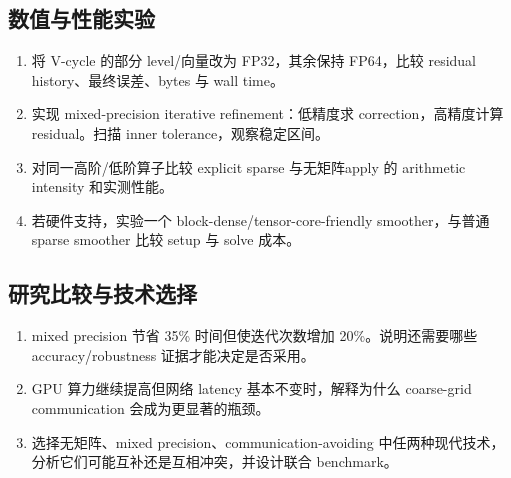 \subsection*{数值与性能实验}
\begin{enumerate}[label=\arabic*.]
\item 将 V-cycle 的部分 level/向量改为 FP32，其余保持 FP64，比较 residual history、最终误差、bytes 与 wall time。
\item 实现 mixed-precision iterative refinement：低精度求 correction，高精度计算 residual。扫描 inner tolerance，观察稳定区间。
\item 对同一高阶/低阶算子比较 explicit sparse 与无矩阵apply 的 arithmetic intensity 和实测性能。
\item 若硬件支持，实验一个 block-dense/tensor-core-friendly smoother，与普通 sparse smoother 比较 setup 与 solve 成本。
\end{enumerate}

\subsection*{研究比较与技术选择}
\begin{enumerate}[label=\arabic*.]
\item mixed precision 节省 35\% 时间但使迭代次数增加 20\%。说明还需要哪些 accuracy/robustness 证据才能决定是否采用。
\item GPU 算力继续提高但网络 latency 基本不变时，解释为什么 coarse-grid communication 会成为更显著的瓶颈。
\item 选择无矩阵、mixed precision、communication-avoiding 中任两种现代技术，分析它们可能互补还是互相冲突，并设计联合 benchmark。
\end{enumerate}
